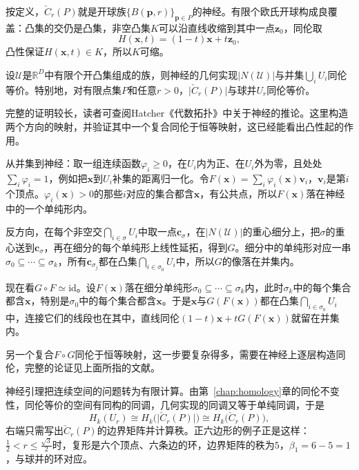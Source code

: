 按定义，$\check C_r(P)$就是开球族$\{B(\bm p,r)\}_{\bm p\in P}$的神经。有限个欧氏开球构成良覆盖：凸集的交仍是凸集，非空凸集$K$可以沿直线收缩到其中一点$\bm z_0$，同伦取
\[
 H(\bm x,t)=(1-t)\bm x+t\bm z_0 ,
\]
凸性保证$H(\bm x,t)\in K$，所以$K$可缩。

\begin{theorem}[神经引理]
\label{thm:mrec-nerve-lemma}
设$\mathcal U$是$\mathbb R^D$中有限个开凸集组成的族，则神经的几何实现$\lvert N(\mathcal U)\rvert$与并集$\bigcup_iU_i$同伦等价。特别地，对有限点集$P$和任意$r>0$，$\lvert\check C_r(P)\rvert$与球并$U_r$同伦等价。
\end{theorem}

完整的证明较长，读者可查阅Hatcher《代数拓扑》中关于神经的推论。这里构造两个方向的映射，并验证其中一个复合同伦于恒等映射，这已经能看出凸性起的作用。

从并集到神经：取一组连续函数$\varphi_i\geq0$，在$U_i$内为正、在$U_i$外为零，且处处$\sum_i\varphi_i=1$，例如把$\bm x$到$U_i$补集的距离归一化。令$F(\bm x)=\sum_i\varphi_i(\bm x)\bm v_i$，$\bm v_i$是第$i$个顶点。$\varphi_i(\bm x)>0$的那些$i$对应的集合都含$\bm x$，有公共点，所以$F(\bm x)$落在神经中的一个单纯形内。

反方向，在每个非空交$\bigcap_{i\in\sigma}U_i$中取一点$\bm c_\sigma$，在$\lvert N(\mathcal U)\rvert$的重心细分上，把$\sigma$的重心送到$\bm c_\sigma$，再在细分的每个单纯形上线性延拓，得到$G$。细分中的单纯形对应一串$\sigma_0\subseteq\cdots\subseteq\sigma_k$，所有$\bm c_{\sigma_j}$都在凸集$\bigcap_{i\in\sigma_0}U_i$中，所以$G$的像落在并集内。

现在看$G\circ F\simeq\mathrm{id}$。设$F(\bm x)$落在细分单纯形$\sigma_0\subseteq\cdots\subseteq\sigma_k$内，此时$\sigma_k$中的每个集合都含$\bm x$，特别是$\sigma_0$中的每个集合都含$\bm x$。于是$\bm x$与$G(F(\bm x))$都在凸集$\bigcap_{i\in\sigma_0}U_i$中，连接它们的线段也在其中，直线同伦$(1-t)\bm x+tG(F(\bm x))$就留在并集内。

另一个复合$F\circ G$同伦于恒等映射，这一步要复杂得多，需要在神经上逐层构造同伦，完整的论证见上面所指的文献。

神经引理把连续空间的问题转为有限计算。由第~\ref{chap:homology}章的同伦不变性，同伦等价的空间有同构的同调，几何实现的同调又等于单纯同调，于是
\begin{equation}
 H_k(U_r)\cong H_k\bigl(\lvert\check C_r(P)\rvert\bigr)\cong H_k\bigl(\check C_r(P)\bigr),
 \label{eq:mrec-nerve-homology}
\end{equation}
右端只需写出$\check C_r(P)$的边界矩阵并计算秩。正六边形的例子正是这样：$\tfrac12<r\leq\tfrac{\sqrt3}2$时，复形是六个顶点、六条边的环，边界矩阵的秩为$5$，$\beta_1=6-5=1$，与球并的环对应。

